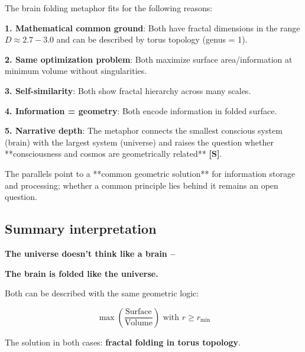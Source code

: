 	\begin{keyresult}
		The brain folding metaphor fits for the following reasons:

		\vspace{0.3cm}

		\textbf{1. Mathematical common ground}:
		Both have fractal dimensions in the range $D \approx 2.7 - 3.0$ and can be described by torus topology (genus = 1).

		\vspace{0.3cm}

		\textbf{2. Same optimization problem}:
		Both maximize surface area/information at minimum volume without singularities.

		\vspace{0.3cm}

		\textbf{3. Self-similarity}:
		Both show fractal hierarchy across many scales.

		\vspace{0.3cm}

		\textbf{4. Information = geometry}:
		Both encode information in folded surface.

		\vspace{0.3cm}

		\textbf{5. Narrative depth}:
		The metaphor connects the smallest conscious system (brain) with the largest system (universe) and raises the question whether **consciousness and cosmos are geometrically related** \textbf{[S]}.

		\vspace{0.3cm}

		The parallels point to a **common geometric solution** for information storage and processing; whether a common principle lies behind it remains an open question.
	\end{keyresult}

	\subsection{Summary interpretation}

	\begin{revolutionary}[Interpretation]

		\begin{center}
			\textbf{The universe doesn't think like a brain --}

			\vspace{0.3cm}

			\textbf{The brain is folded like the universe.}
		\end{center}

		\normalsize

		\vspace{0.3cm}

		Both can be described with the same geometric logic:

		\begin{equation}
			\boxed{\max\left(\frac{\text{Surface}}{\text{Volume}}\right) \text{ with } r \geq r_{\min}}
		\end{equation}

		The solution in both cases: \textbf{fractal folding in torus topology}.
	\end{revolutionary}
